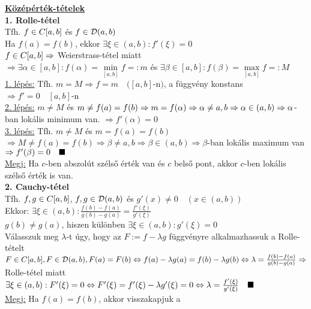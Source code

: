 \documentclass[a4paper,11pt]{article}
\begin{document}
\textbf{\underline{{\large Középérték-tételek}}}\\[0.2cm]\textbf{1. 
Rolle-tétel}\\[0.1cm] \tetel Tfh. $f\in C[a,b]$ és $f\in\mathcal{D}(a,b)$\\[0.2cm]Ha $f(a)=f(b)$, 
ekkor $\exists\xi\in(a,b):f'(\xi)=0$\\[0.2cm]\biz $f\in C[a,b]\Rightarrow$ 
Weierstrass-tétel miatt\\[0.2cm]$\Rightarrow\exists\alpha\in[a,b]:f(\alpha)= 
\min\limits_{[a,b]}f=:m$ és $\exists\beta\in[a,b]:f(\beta)= 
\max\limits_{[a,b]}f=:M$
\\[0.2cm]\underline{1. lépés:} Tfh. $m=M\Rightarrow f=m\quad([a,b]$-n$)$, a 
függvény konstans $\Rightarrow f'=0\quad[a,b]$-n\\[0.2cm]\underline{2. lépés:} 
$m\neq M$ és $m\neq f(a)=f(b)\Rightarrow m=f(\alpha)\Rightarrow\alpha\neq a,b 
\Rightarrow\alpha\in(a,b)\\[0.2cm]\Rightarrow\alpha$-ban lokális minimum van. 
$\Rightarrow f'(\alpha)=0$\\[0.2cm]\underline{3. lépés:} Tfh. $m\neq M$ és 
$m=f(a) =f(b)$\\[0.2cm]$\Rightarrow M\neq f(a)=f(b)\Rightarrow\beta\neq 
a,b\Rightarrow\beta \in(a,b)\Rightarrow\beta$-ban lokális maximum van 
$\Rightarrow f'(\beta)=0\quad\blacksquare$ \\[0.2cm]\hspace*{0.6cm}\underline{Megj:} Ha 
$c$-ben abszolút szélső érték van és $c$ belső pont, akkor $c$-ben lokális 
szélső érték is van.\\[0.2cm]\textbf{2. Cauchy-tétel}\\[0.1cm]\tetel Tfh. 
$f,g\in C[a,b]$, $f,g\in\mathcal{D}(a,b)$ és $g'(x)\neq0\quad(x\in(a,b))$\\[0.2cm]Ekkor: 
$\exists\xi\in(a,b):\frac{f(b)-f(a)}{g(b)-g(a)}=\frac{f'(\xi)}{g'(\xi)}$
\\[0.2cm]\biz$g(b)\neq g(a)$, hiszen különben $\exists\xi\in(a,b):g'(\xi)=0$
\\[0.2cm]Válasszuk meg $\lambda$-t úgy, hogy az $F:=f-\lambda g$ függvényre 
alkalmazhassuk a Rolle-tételt\\[0.2cm]$F\in C[a,b],F\in\mathcal{D}(a,b), F(a)=F(b)\Leftrightarrow 
f(a)-\lambda g(a)= f(b)-\lambda g(b)\Leftrightarrow\lambda=
\frac{f(b)-f(a)}{g(b)-g(a)}\\[0.2cm] \Rightarrow$ Rolle-tétel miatt 
$\exists\xi\in(a,b):F'(\xi)=0\Leftrightarrow F'(\xi) =f'(\xi)-\lambda 
g'(\xi)=0\Leftrightarrow\lambda=\frac{f'(\xi)}{g'(\xi)}\quad\blacksquare$ 
\\[0.2cm]\hspace*{0.6cm}\underline{Megj:} Ha $f(a)=f(b)$, akkor visszakapjuk a 
\end{document}
